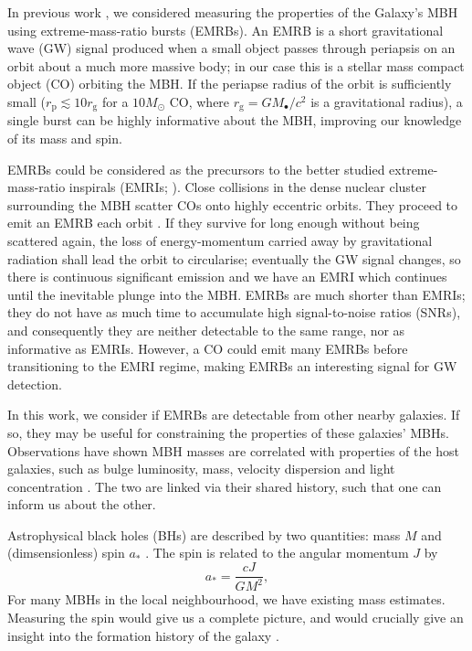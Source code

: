 \documentclass[useAMS,usedcolumn,usegraphicx,usenatbib]{mn2e}
\newcommand{\sub}[1]{\ensuremath{_\mathrm{#1}}}
\begin{document}
In previous work \citep{Berry2013}, we considered measuring the properties of the Galaxy's MBH using extreme-mass-ratio bursts (EMRBs). An EMRB is a short gravitational wave (GW) signal produced when a small object passes through periapsis on an orbit about a much more massive body; in our case this is a stellar mass compact object (CO) orbiting the MBH. If the periapse radius of the orbit is sufficiently small ($r\sub{p} \lesssim 10 r\sub{g}$ for a $10 M_\odot$ CO, where $r\sub{g} = GM_\bullet/c^2$ is a gravitational radius), a single burst can be highly informative about the MBH, improving our knowledge of its mass and spin.

EMRBs could be considered as the precursors to the better studied extreme-mass-ratio inspirals (EMRIs; \citealt{Amaro-Seoane2007}). Close collisions in the dense nuclear cluster surrounding the MBH scatter COs onto highly eccentric orbits. They proceed to emit an EMRB each orbit \citep*{Rubbo2006}. If they survive for long enough without being scattered again, the loss of energy-momentum carried away by gravitational radiation shall lead the orbit to circularise; eventually the GW signal changes, so there is continuous significant emission and we have an EMRI which continues until the inevitable plunge into the MBH. EMRBs are much shorter than EMRIs; they do not have as much time to accumulate high signal-to-noise ratios (SNRs), and consequently they are neither detectable to the same range, nor as informative as EMRIs. However, a CO could emit many EMRBs before transitioning to the EMRI regime, making EMRBs an interesting signal for GW detection.

In this work, we consider if EMRBs are detectable from other nearby galaxies. If so, they may be useful for constraining the properties of these galaxies' MBHs. Observations have shown MBH masses are correlated with properties of the host galaxies, such as bulge luminosity, mass, velocity dispersion and light concentration \citep[e.g.][]{Kormendy1995, Magorrian1998, Graham2011}. The two are linked via their shared history, such that one can inform us about the other.

Astrophysical black holes (BHs) are described by two quantities: mass $M$ and (dimsensionless) spin $a_\ast$ \citep{Chandrasekhar1998}. The spin is related to the angular momentum $J$ by
\begin{equation}
a_\ast = \frac{cJ}{GM^2},
\end{equation}
For many MBHs in the local neighbourhood, we have existing mass estimates. Measuring the spin would give us a complete picture, and would crucially give an insight into the formation history of the galaxy \citep{Dotti2012,Volonteri2012a}.
\end{document}
